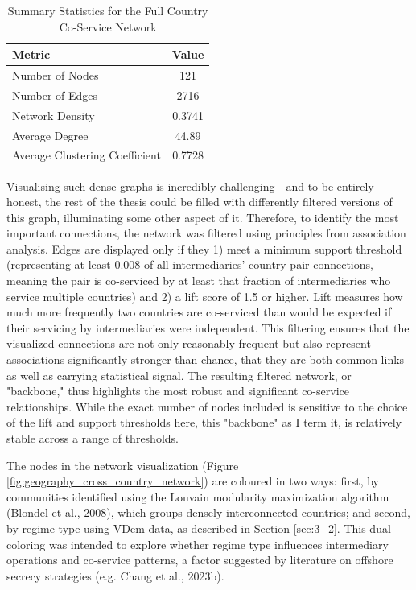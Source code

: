 \begin{table}[htbp]
\centering
\caption{Summary Statistics for the Full Country Co-Service Network}
\label{tab:country_network_summary}
\begin{tabular}{lc}
\toprule
\textbf{Metric}                        & \textbf{Value}    \\
\midrule
Number of Nodes               & 121      \\
Number of Edges               & 2716     \\
Network Density               & 0.3741   \\
Average Degree                & 44.89    \\
Average Clustering Coefficient & 0.7728   \\
\bottomrule
\end{tabular}
\end{table}

Visualising such dense graphs is incredibly challenging - and to be entirely honest, the rest of the thesis could be filled with differently filtered versions of this graph, illuminating some other aspect of it. Therefore, to identify the most important connections, the network was filtered using principles from association analysis. Edges are displayed only if they 1) meet a minimum support threshold (representing at least 0.008 of all intermediaries' country-pair connections, meaning the pair is co-serviced by at least that fraction of intermediaries who service multiple countries) and 2) a lift score of 1.5 or higher. Lift measures how much more frequently two countries are co-serviced than would be expected if their servicing by intermediaries were independent. This filtering ensures that the visualized connections are not only reasonably frequent but also represent associations significantly stronger than chance, that they are both common links as well as carrying statistical signal. The resulting filtered network, or "backbone," thus highlights the most robust and significant co-service relationships. While the exact number of nodes included is sensitive to the choice of the lift and support thresholds here, this "backbone" as I term it, is relatively stable across a range of thresholds.

The nodes in the network visualization (Figure \ref{fig:geography_cross_country_network}) are coloured in two ways: first, by communities identified using the Louvain modularity maximization algorithm (Blondel et al., 2008), which groups densely interconnected countries; and second, by regime type using VDem data, as described in Section \ref{sec:3_2}. This dual coloring was intended to explore whether regime type influences intermediary operations and co-service patterns, a factor suggested by literature on offshore secrecy strategies (e.g. Chang et al., 2023b).

